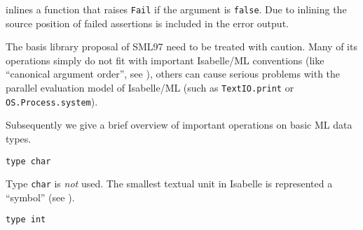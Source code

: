 \begin{isabellebody}
\begin{isamarkuptext}
  \begin{description}

  \item {} inlines a function 
  that raises \verb|Fail| if the argument is \verb|false|.  Due to
  inlining the source position of failed assertions is included in the
  error output.

  \end{description}%
\end{isamarkuptext}%
\isamarkuptrue%
%
\endisatagmlantiq
{\isafoldmlantiq}%
%
\isadelimmlantiq
%
\endisadelimmlantiq
%
\isamarkuptrue%
%
\begin{isamarkuptext}%
The basis library proposal of SML97 need to be treated with
  caution.  Many of its operations simply do not fit with important
  Isabelle/ML conventions (like ``canonical argument order'', see
  ), others can cause serious
  problems with the parallel evaluation model of Isabelle/ML (such as
  \verb|TextIO.print| or \verb|OS.Process.system|).

  Subsequently we give a brief overview of important operations on
  basic ML data types.%
\end{isamarkuptext}%
\isamarkuptrue%
%
\isamarkuptrue%
%
\isadelimmlref
%
\endisadelimmlref
%
\isatagmlref
%
\begin{isamarkuptext}%
\begin{mldecls}
  \verb|type char| \\
  \end{mldecls}

  \begin{description}

  \item Type \verb|char| is \emph{not} used.  The smallest textual
  unit in Isabelle is represented a ``symbol'' (see
  ).

  \end{description}%
\end{isamarkuptext}%
\isamarkuptrue%
%
\endisatagmlref
{\isafoldmlref}%
%
\isadelimmlref
%
\endisadelimmlref
%
\isamarkuptrue%
%
\isadelimmlref
%
\endisadelimmlref
%
\isatagmlref
%
\begin{isamarkuptext}%
\begin{mldecls}
  \verb|type int| \\
  \end{mldecls}


\end{isamarkuptext}
\end{isabellebody}
